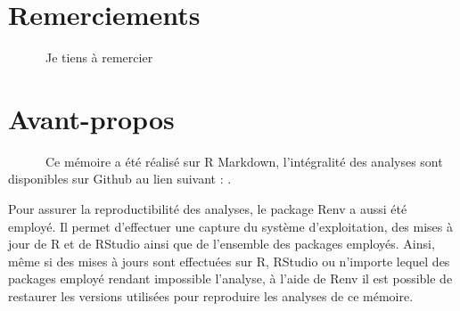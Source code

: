 \documentclass[
  12pt,
]{article}
\begin{document}

{}
\chapter*{Remerciements}

\vspace{.5cm}

~~~~~~Je tiens à remercier

\newpage

{}
\chapter*{\huge Avant-propos}

\vspace{.5cm}

~~~~~~Ce mémoire a été réalisé sur R Markdown, l'intégralité des
analyses sont disponibles sur Github au lien suivant : .

Pour assurer la reproductibilité des analyses, le package Renv a aussi
été employé. Il permet d'effectuer une capture du système
d'exploitation, des mises à jour de R et de RStudio ainsi que de
l'ensemble des packages employés. Ainsi, même si des mises à jours sont
effectuées sur R, RStudio ou n'importe lequel des packages employé
rendant impossible l'analyse, à l'aide de Renv il est possible de
restaurer les versions utilisées pour reproduire les analyses de ce
mémoire.

\newpage
\end{document}
